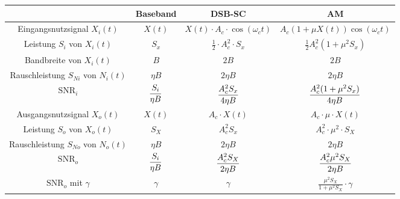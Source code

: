 \documentclass[a4paper]{article}
\begin{document}
\begin{twocolumn}
\begin{footnotesize}
\begin{tabular}{|c|c|c|c|}
  \hline 
  & \textbf{Baseband} & \textbf{DSB-SC} & \textbf{AM} \\ \hline
  Eingangsnutzsignal $X_i(t)$ & $X(t)$ & $X(t) \cdot A_c \cdot \cos(\omega_c t)$ & $A_c (1 + \mu X(t)) \cos(\omega_c t)$ \\\hline
  Leistung $S_i$ von $X_i(t)$ & $S_x$ & $\frac{1}{2} \cdot A_c^2 \cdot S_x$ & $\frac{1}{2}A_c^2 (1 + \mu^2 S_x)$ \\ \hline
  Bandbreite von $X_i(t)$ & $B$ & $2B$ & $2B$ \\ \hline
  Rauschleistung $S_{Ni}$ von $N_i(t)$ & $\eta B$ & $2 \eta B$ & $2 \eta B$ \\ \hline
  $\text{SNR}_i$ & $\displaystyle \frac{S_i}{\eta B}$ & $\displaystyle \frac{A_c^2 S_x}{4 \eta B}$ & $\displaystyle \frac{A_c^2 (1 + \mu^2 S_x)}{4 \eta B}$ \\ \hline
  Ausgangsnutzsignal $X_o(t)$ & $X(t)$ & $A_c \cdot X(t)$ & $A_c \cdot \mu \cdot X(t)$ \\ \hline
  Leistung $S_o$ von $X_o(t)$ & $S_X$ & $A_c^2 S_x$ & $A_c^2 \cdot \mu^2 \cdot S_X$ \\ \hline
  Rauschleistung $S_{No}$ von $N_o(t)$ & $\eta B$ & $2 \eta B$ & $2 \eta B$ \\ \hline
  $\text{SNR}_o$ & $\displaystyle \frac{S_i}{\eta B}$ & $\displaystyle \frac{A_c^2 S_X}{2 \eta B}$ & $\displaystyle \frac{A_c^2 \mu^2 S_X}{2 \eta B}$ \\ \hline
  $\text{SNR}_o$ mit $\gamma$ & $\gamma$ & $\gamma$ & $\frac{\mu^2 S_X}{1 + \mu^2 S_X} \cdot \gamma$ \\ \hline 
\end{tabular} 


\end{footnotesize}
\end{twocolumn}
\end{document}
